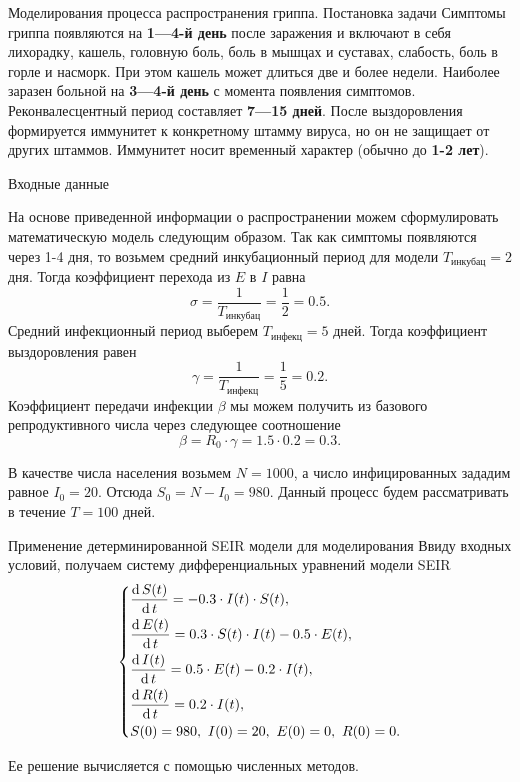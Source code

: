 \documentclass[notheorems]{beamer}
\renewcommand{\d}{\operatorname{d}}
\begin{document}

\begin{frame}
	{Моделирования процесса распространения гриппа. Постановка задачи
	}
	Симптомы гриппа появляются на \textbf{1—4-й день} после заражения и включают в себя лихорадку, кашель, головную боль, боль в мышцах и суставах, слабость, боль в горле и насморк. При этом кашель может длиться две и более недели. Наиболее заразен больной на \textbf{3—4-й день} с момента появления симптомов. Реконвалесцентный период составляет \textbf{7—15 дней}. После выздоровления формируется иммунитет к конкретному штамму вируса, но он не защищает от других штаммов. Иммунитет носит временный характер (обычно до \textbf{1-2 лет}).
\end{frame}


\begin{frame}
	{Входные данные}
\small {На основе приведенной информации о распространении можем сформулировать математическую модель следующим образом. Так как симптомы появляются через 1-4 дня, то возьмем средний инкубационный период для модели $T_\text{инкубац} = 2$ дня. Тогда коэффициент перехода из $E$ в $I$ равна
$$\sigma = \dfrac{1}{T_\text{инкубац}} = \dfrac 1 2 = 0.5.$$
Средний инфекционный период выберем $T_\text{инфекц}=5$ дней.
Тогда коэффициент выздоровления равен
$$\gamma = \dfrac{1}{T_\text{инфекц}} = \dfrac 1 5 = 0.2.$$
Коэффициент передачи инфекции $\beta$ мы можем получить из  базового репродуктивного числа через следующее соотношение
$$\beta = R_0\cdot \gamma = 1.5\cdot 0.2 = 0.3.$$

В качестве числа населения возьмем $N=1000$, а число инфицированных зададим равное $I_0 = 20$. Отсюда $S_0 = N - I_0 = 980$. Данный процесс будем рассматривать в течение $T=100$ дней.}
\end{frame}


\begin{frame}
	{Применение детерминированной SEIR модели для моделирования}
	Ввиду входных условий, получаем систему дифференциальных уравнений модели SEIR
	\begin{equation*}
		\begin{dcases}
			\dfrac {\d S(t)}{\d t} = - 0.3 \cdot I(t)\cdot S(t),\\
			\dfrac {\d E(t)}{\d t} = 0.3 \cdot S(t)\cdot I(t) - 0.5\cdot E(t),\\
			\dfrac{\d I(t)}{\d t} =0.5 \cdot E(t) - 0.2\cdot I(t),\\
			\dfrac{\d R(t)}{\d t} = 0.2\cdot I(t),\\
			S(0) = 980,\ I(0) = 20,\ E(0) = 0,\ R(0) = 0.
		\end{dcases}
	\end{equation*} 
	
	Ее решение вычисляется с помощью численных методов.
\end{frame}
\end{document}
